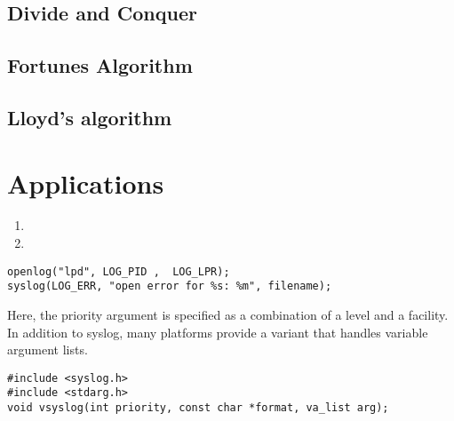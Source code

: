 \documentclass[12pt]{article} %
\begin{document}
\subsection{Divide and Conquer}
      

\subsection{Fortunes Algorithm}






\subsection{Lloyd's algorithm}

\section{Applications}
\begin{enumerate}
\item{}
\item{}
\end{enumerate}

\begin{verbatim}
openlog("lpd", LOG_PID ,  LOG_LPR);
syslog(LOG_ERR, "open error for %s: %m", filename);
\end{verbatim}



Here,  the priority argument is specified as a combination of a level and a facility.
In addition to syslog, many platforms provide a variant that handles variable argument lists.
\begin{verbatim}
#include <syslog.h>
#include <stdarg.h>
void vsyslog(int priority, const char *format, va_list arg);
\end{verbatim}
\end{document}
